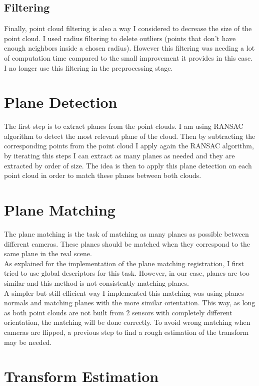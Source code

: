 \subsection{Filtering}

Finally, point cloud filtering is also a way I considered to decrease the size of the point cloud. I used radius filtering to delete outliers (points that don’t have enough neighbors inside a chosen radius). However this filtering was needing a lot of computation time compared to the small improvement it provides in this case. I no longer use this filtering in the preprocessing stage. 

\section{Plane Detection}

The first step is to extract planes from the point clouds. I am using RANSAC algorithm to detect the most relevant plane of the cloud. Then by subtracting the corresponding points from the point cloud I apply again the RANSAC algorithm, by iterating this steps I can extract as many planes as needed and they are extracted by order of size. The idea is then to apply this plane detection on each point cloud in order to match these planes between both clouds. 

\section{Plane Matching}

The plane matching is the task of matching as many planes as possible between different cameras. These planes should be matched when they correspond to the same plane in the real scene. \\
As explained for the implementation of the plane matching registration, I first tried to use global descriptors for this task. However, in our case, planes are too similar and this method is not consistently matching planes. \\
A simpler but still efficient way I implemented this matching was using planes normals and matching planes with the more similar orientation. This way, as long as both point clouds are not built from 2 sensors with completely different orientation, the matching will be done correctly. To avoid wrong matching when cameras are flipped, a previous step to find a rough estimation of the transform may be needed.

\section{Transform Estimation}

